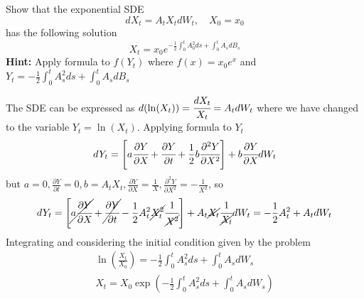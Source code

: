 \documentclass[12pt,a4paper]{exam}
\begin{document}
\begin{questions}
\question Show that the exponential SDE
\begin{equation*}
dX_t = A_t X_tdW_t,\quad X_0=x_0
\end{equation*}
has the following solution
\begin{equation*}
X_t = x_0 e^{-\frac{1}{2}\int_0^t A_0^2 ds+\int_0^t A_s dB_s}
\end{equation*}
\textbf{Hint:} Apply \ito formula to $f(Y_t)$ where $f(x)=x_0 e^x$ and $Y_t=-\frac{1}{2}\int_0^t A_s^2 ds + \int_0^t A_s dB_s$
\fillwithlines{3cm}
\begin{solution}
The SDE can be expressed as $d(\ln(X_t)) = \cfrac{dX_t}{X_t} = A_t dW_t$ where we have changed to the variable $Y_t = \ln(X_t)$. Applying \ito formula to $Y_t$ 
\begin{equation*}
dY_t = \left[a\cfrac{\partial Y}{\partial X} + \cfrac{\partial Y}{\partial t} + \frac{1}{2}b\cfrac{\partial^2 Y}{\partial X^2}\right]+ b\cfrac{\partial Y}{\partial X}dW_t
\end{equation*}
but $a=0, \frac{\partial Y}{\partial t}=0, b=A_tX_t, \frac{\partial Y}{\partial X}=\frac{1}{X}, \frac{\partial^2 Y}{\partial X^2}=-\frac{1}{X^2}$, so
\begin{equation*}
dY_t = \left[\cancel{a\cfrac{\partial Y}{\partial X}} + \cancel{\cfrac{\partial Y}{\partial t}} - \frac{1}{2}A_t^2 \cancel{X_t^2}\cfrac{1}{\cancel{X^2}}\right]+ A_t\cancel{X_t}\cfrac{1}{\cancel{X_t}}dW_t = -\frac{1}{2}A_t^2 + A_t dW_t
\end{equation*}
Integrating and considering the initial condition given by the problem
\begin{equation*}
\begin{gathered}
\ln\left(\frac{X_t}{X_0}\right) = -\frac{1}{2}\int_0^t A_s^2 ds + \int_0^tA_s dW_s \\
X_t = X_0 \exp\left(-\frac{1}{2}\int_0^t A_s^2 ds + \int_0^tA_s dW_s \right)
\end{gathered}
\end{equation*}
%
%
%
%
%
%
%
%
%
%
%
%
\end{solution}


\end{questions}
\end{document}
